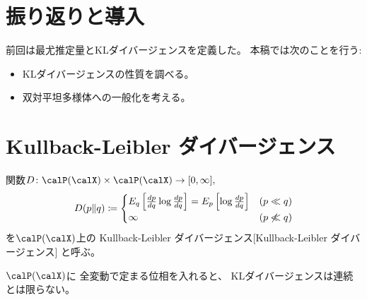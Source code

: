 \documentclass[report]{jlreq}
\begin{document}
%

%
\section*{振り返りと導入}

前回は最尤推定量とKLダイバージェンスを定義した。
本稿では次のことを行う:
\begin{itemize}
    \item KLダイバージェンスの性質を調べる。
    \item 双対平坦多様体への一般化を考える。
\end{itemize}

%
\section{Kullback-Leibler ダイバージェンス}

\begin{definition}
    関数$D \colon \calP(\calX) \times \calP(\calX) \to [0, \infty],$
    \begin{equation}
        D(p \| q)
            \coloneqq
                \begin{cases}
                    E_q \left[{
                        \frac{dp}{dq}
                        \log \frac{dp}{dq}
                    }\right]
                        =
                            E_p \left[{
                                \log \frac{dp}{dq}
                            }\right]
                        & (p \ll q) \\
                    \infty
                        & (p \not\ll q)
                \end{cases}
    \end{equation}
    を$\calP(\calX)$上の
        {Kullback-Leibler ダイバージェンス}[Kullback-Leibler ダイバージェンス]
    と呼ぶ。
\end{definition}

\begin{proposition}
    $\calP(\calX)$に
    全変動で定まる位相を入れると、
    KLダイバージェンスは連続とは限らない。
\end{proposition}
\end{document}

